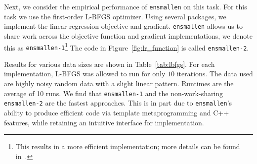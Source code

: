\documentclass[twoside,11pt]{article}
\begin{document}

Next, we consider the empirical performance of {\tt ensmallen} on this task.
For this task we use the first-order L-BFGS optimizer.
Using several packages, we implement
the linear regression objective and gradient.  {\tt ensmallen}
allows us to share work across the objective function and gradient
implementations, we denote this as {\tt ensmallen-1}\footnote{This results in a
more efficient implementation; more details can be found in~\citet{ensmallen2020}.}
The code in Figure~\ref{fig:lr_function} is called \texttt{ensmallen-2}.

Results for various data sizes are shown in Table~\ref{tab:lbfgs}.  For each
implementation, L-BFGS was allowed to run for only $10$ iterations.  The
data used are highly noisy random
data with a slight linear pattern. %
Runtimes are the
average of 10 runs.
We find that \texttt{ensmallen-1} and the non-work-sharing {\tt ensmallen-2}
are the fastest approaches.
This is in part due to {\tt ensmallen}'s ability to produce efficient code via
template metaprogramming and C++ features, while retaining an intuitive
interface for implementation.
\end{document}
